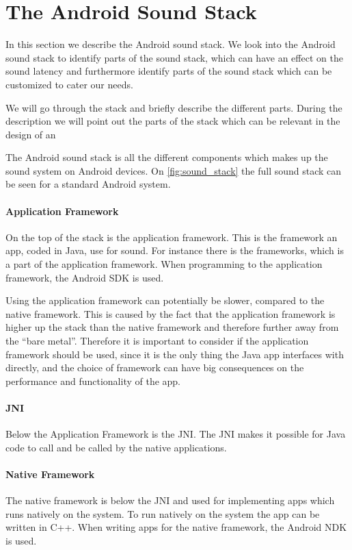 \section{The Android Sound Stack}
In this section we describe the Android sound stack.
We look into the Android sound stack to identify parts of the sound stack,
which can have an effect on the sound latency and furthermore identify parts of the sound stack which can be customized to cater our needs.

We will go through the stack and briefly describe the different parts.
During the description we will point out the parts of the stack which can be relevant in the design of an 

The Android sound stack is all the different components which makes up the sound system on Android devices.
On \cref{fig:sound_stack} the full sound stack can be seen for a standard Android system.

\paragraph{Application Framework}
On the top of the stack is the application framework.
This is the framework an app, coded in Java, use for sound.
For instance there is the  frameworks, which is a part of the application framework.
When programming to the application framework, the Android \ac{SDK} is used.

Using the application framework can potentially be slower, compared to the native framework.
This is caused by the fact that the application framework is higher up the stack than the native framework and therefore further away from the ``bare metal''.
Therefore it is important to consider if the application framework should be used,
since it is the only thing the Java app interfaces with directly, 
and the choice of framework can have big consequences on the performance and functionality of the app.

\paragraph{JNI}
Below the Application Framework is the \ac{JNI}.
The \ac{JNI} makes it possible for Java code to call and be called by the native applications\cite{jni}.

\paragraph{Native Framework}
The native framework is below the \ac{JNI} and used for implementing apps which runs natively on the system.
To run natively on the system the app can be written in C++.
When writing apps for the native framework, the Android \ac{NDK} is used.

